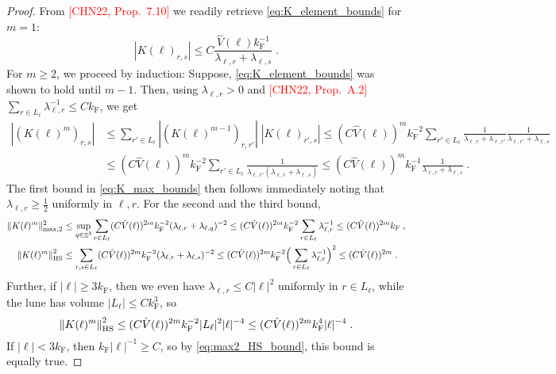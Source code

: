 \documentclass[sn-mathphys, Numbered ,a4paper]{sn-jnl}%
\DeclareMathOperator{\Z}{\mathbb{Z}}
\newcommand{\F}{\mathrm{F}}
\theoremstyle{plain}
\theoremstyle{definition}
\theoremstyle{remark}
\theoremstyle{plain}
\theoremstyle{definition}
\theoremstyle{remark}
\begin{document}
\begin{proof}
From \textcolor{red}{[CHN22, Prop.~7.10]} we readily retrieve \eqref{eq:K_element_bounds} for $ m = 1 $:
\begin{equation}
	|K(\ell)_{r,s}|
	\le C \frac{\hat{V}(\ell) k_{\F}^{-1}}{\lambda_{\ell,r} + \lambda_{\ell,s}} \;.
\end{equation}
For $ m \ge 2 $, we proceed by induction: Suppose, \eqref{eq:K_element_bounds} was shown to hold until $ m-1 $. Then, using $ \lambda_{\ell,r} > 0 $ and \textcolor{red}{[CHN22, Prop.~A.2]} $ \sum_{r \in L_\ell} \lambda_{\ell,r}^{-1} \le C k_{\F} $, we get
\begin{equation}
	\begin{aligned}
		|(K(\ell)^m)_{r,s}|
		&\le \sum_{r' \in L_\ell}
		|(K(\ell)^{m-1})_{r,r'}| \;
		|K(\ell)_{r',s}|
		\le (C \hat{V}(\ell))^m k_{\F}^{-2} \sum_{r' \in L_\ell}
		\frac{1}{\lambda_{\ell, r} + \lambda_{\ell, r'}}
		\frac{1}{\lambda_{\ell, r'} + \lambda_{\ell, s}} \\
		&\le (C \hat{V}(\ell))^m k_{\F}^{-2} \sum_{r' \in L_\ell}
		\frac{1}{\lambda_{\ell, r'} (\lambda_{\ell, r} + \lambda_{\ell, s})}
		\le (C \hat{V}(\ell))^m k_{\F}^{-1}
		\frac{1}{\lambda_{\ell, r} + \lambda_{\ell, s}} \;.
	\end{aligned}
\end{equation}
The first bound in \eqref{eq:K_max_bounds} then follows immediately noting that $ \lambda_{\ell,r} \ge \frac 12 $ uniformly in $ \ell, r $. For the second and the third bound,
\begin{equation} \label{eq:max2_HS_bound}
\begin{aligned}
	\Vert K(\ell)^m \Vert_{\mathrm{max},2}^2
	&\le \sup_{q \in \Z^3} \sum_{r \in L_\ell} (C \hat{V}(\ell))^{2m} k_{\F}^{-2} (\lambda_{\ell,r} + \lambda_{\ell,q})^{-2}
	\le (C \hat{V}(\ell))^{2m} k_{\F}^{-2} \sum_{r \in L_\ell} \lambda_{\ell,r}^{-1}
	\le (C \hat{V}(\ell))^{2m} k_{\F} \;, \\
	\norm{K(\ell)^m}_{\mathrm{HS}}^2
	&\le \sum_{r,s \in L_\ell} (C \hat{V}(\ell))^{2m} k_{\F}^{-2} (\lambda_{\ell,r} + \lambda_{\ell,s})^{-2}
	\le (C \hat{V}(\ell))^{2m} k_{\F}^{-2} \Big( \sum_{r \in L_\ell}  \lambda_{\ell,r}^{-1} \Big)^2
	\le (C \hat{V}(\ell))^{2m} \;.
\end{aligned}
\end{equation}
Further, if $ |\ell| \ge 3 k_{\F} $, then we even have $ \lambda_{\ell,r} \le C |\ell|^2 $ uniformly in $ r \in L_\ell $, while the lune has volume $ |L_\ell| \le C k_{\F}^3 $, so
\begin{equation}
	\norm{K(\ell)^m}_{\mathrm{HS}}^2
	\le (C \hat{V}(\ell))^{2m} k_{\F}^{-2} |L_\ell|^2 |\ell|^{-4}
	\le (C \hat{V}(\ell))^{2m} k_{\F}^4 |\ell|^{-4} \;.
\end{equation}
If $ |\ell| < 3 k_{\F} $, then $ k_{\F} |\ell|^{-1} \ge C $, so by \eqref{eq:max2_HS_bound}, this bound is equally true.
\end{proof}
\end{document}
